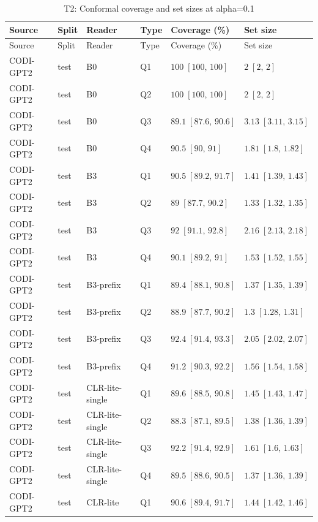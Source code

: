 \begingroup\scriptsize\setlength{\tabcolsep}{3pt}
\begin{longtable}{@{}p{}p{}p{}p{}p{}p{}@{}}
\caption{T2: Conformal coverage and set sizes at alpha=0.1}\label{tab:t2-conformal}\\
\toprule
Source & Split & Reader & Type & Coverage (\%) & Set size \\
\midrule\endfirsthead
\toprule
Source & Split & Reader & Type & Coverage (\%) & Set size \\
\midrule\endhead
CODI-GPT2 & test & B0 & Q1 & $100\;[100,\,100]$ & $2\;[2,\,2]$ \\
CODI-GPT2 & test & B0 & Q2 & $100\;[100,\,100]$ & $2\;[2,\,2]$ \\
CODI-GPT2 & test & B0 & Q3 & $89.1\;[87.6,\,90.6]$ & $3.13\;[3.11,\,3.15]$ \\
CODI-GPT2 & test & B0 & Q4 & $90.5\;[90,\,91]$ & $1.81\;[1.8,\,1.82]$ \\
CODI-GPT2 & test & B3 & Q1 & $90.5\;[89.2,\,91.7]$ & $1.41\;[1.39,\,1.43]$ \\
CODI-GPT2 & test & B3 & Q2 & $89\;[87.7,\,90.2]$ & $1.33\;[1.32,\,1.35]$ \\
CODI-GPT2 & test & B3 & Q3 & $92\;[91.1,\,92.8]$ & $2.16\;[2.13,\,2.18]$ \\
CODI-GPT2 & test & B3 & Q4 & $90.1\;[89.2,\,91]$ & $1.53\;[1.52,\,1.55]$ \\
CODI-GPT2 & test & B3-prefix & Q1 & $89.4\;[88.1,\,90.8]$ & $1.37\;[1.35,\,1.39]$ \\
CODI-GPT2 & test & B3-prefix & Q2 & $88.9\;[87.7,\,90.2]$ & $1.3\;[1.28,\,1.31]$ \\
CODI-GPT2 & test & B3-prefix & Q3 & $92.4\;[91.4,\,93.3]$ & $2.05\;[2.02,\,2.07]$ \\
CODI-GPT2 & test & B3-prefix & Q4 & $91.2\;[90.3,\,92.2]$ & $1.56\;[1.54,\,1.58]$ \\
CODI-GPT2 & test & CLR-lite-single & Q1 & $89.6\;[88.5,\,90.8]$ & $1.45\;[1.43,\,1.47]$ \\
CODI-GPT2 & test & CLR-lite-single & Q2 & $88.3\;[87.1,\,89.5]$ & $1.38\;[1.36,\,1.39]$ \\
CODI-GPT2 & test & CLR-lite-single & Q3 & $92.2\;[91.4,\,92.9]$ & $1.61\;[1.6,\,1.63]$ \\
CODI-GPT2 & test & CLR-lite-single & Q4 & $89.5\;[88.6,\,90.5]$ & $1.37\;[1.36,\,1.39]$ \\
CODI-GPT2 & test & CLR-lite & Q1 & $90.6\;[89.4,\,91.7]$ & $1.44\;[1.42,\,1.46]$ \\

\end{longtable}

